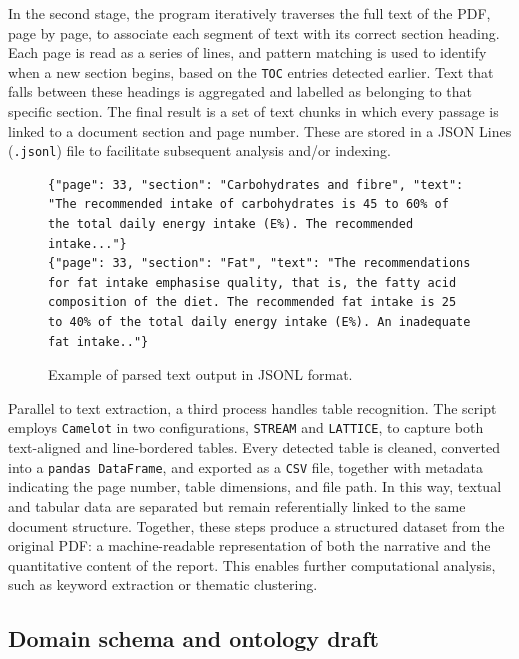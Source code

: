In the second stage, the program iteratively traverses the full text of the PDF, page by page, to associate each segment of text with its correct section heading. Each page is read as a series of lines, and pattern matching is used to identify when a new section begins, based on the \texttt{TOC} entries detected earlier. Text that falls between these headings is aggregated and labelled as belonging to that specific section. 
The final result is a set of text chunks in which every passage is linked to a document section and page number. These are stored in a JSON Lines (\texttt{.jsonl}) file to facilitate subsequent analysis and/or indexing.

\begin{figure}[h!]
\centering
\begin{lstlisting}
{"page": 33, "section": "Carbohydrates and fibre", "text": "The recommended intake of carbohydrates is 45 to 60% of the total daily energy intake (E%). The recommended intake..."}
{"page": 33, "section": "Fat", "text": "The recommendations for fat intake emphasise quality, that is, the fatty acid composition of the diet. The recommended fat intake is 25 to 40% of the total daily energy intake (E%). An inadequate fat intake.."}
\end{lstlisting}
\caption{Example of parsed text output in JSONL format.}
\label{fig:jsonl_example}
\end{figure}


Parallel to text extraction, a third process handles table recognition. The script employs \texttt{Camelot} \cite{camelot_py} in two configurations, \texttt{STREAM} and \texttt{LATTICE}, to capture both text-aligned and line-bordered tables.
Every detected table is cleaned, converted into a \texttt{pandas DataFrame}, and exported as a \texttt{CSV} file, together with metadata indicating the page number, table dimensions, and file path. In this way, textual and tabular data are separated but remain referentially linked to the same document structure.
Together, these steps produce a structured dataset from the original PDF: a machine-readable representation of both the narrative and the quantitative content of the report. This enables further computational analysis, such as keyword extraction or thematic clustering.



\subsection{Domain schema and ontology draft}

